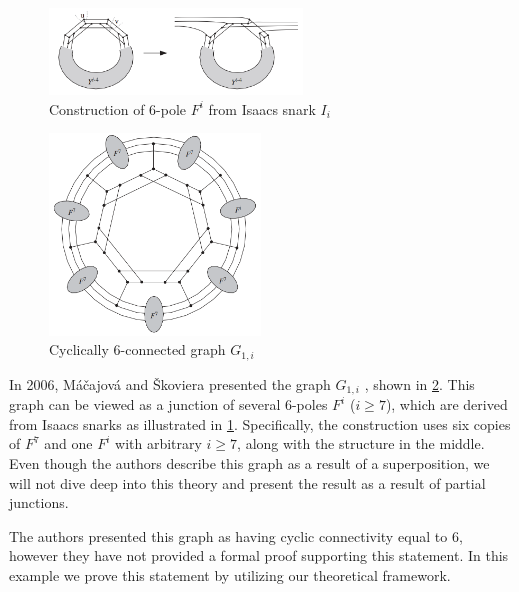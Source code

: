 \documentclass[12pt, twoside]{book}
\begin{document}
\begin{example}
	\begin{figure}
		\centering
		\includegraphics[width=0.6\textwidth]{images/create-Fi-from-Isaacs}
		\caption{\cite{Macajova2006} Construction of 6-pole $F^i$ from Isaacs snark $I_i$}
		\label{fig:construction-fi-from-isaacs}
	\end{figure}

	\begin{figure}
		\centering
		\includegraphics[width=0.5\textwidth]{images/snark-Gi-from-Isaacs}
		\caption{\cite{Macajova2006} Cyclically 6-connected graph $G_{1,i}$}
		\label{fig:cyc-6-graph-Macajova}
	\end{figure}

	In 2006, Máčajová and Škoviera presented the graph $G_{1,i}$ \cite{Macajova2006}, shown in \cref{fig:cyc-6-graph-Macajova}. This graph can be viewed as a junction of several 6-poles $F^i$ ($i\geq 7$), which are derived from Isaacs snarks \cite{Isaacs1975} as illustrated in \cref{fig:construction-fi-from-isaacs}. Specifically, the construction uses six copies of $F^7$ and one $F^i$ with arbitrary $i\geq 7$, along with the structure in the middle. Even though the authors describe this graph as a result of a superposition, we will not dive deep into this theory and present the result as a result of partial junctions.
	
	The authors presented this graph as having cyclic connectivity equal to 6, however they have not provided a formal proof supporting this statement. In this example we prove this statement by utilizing our theoretical framework.
	

\end{example}
\end{document}
